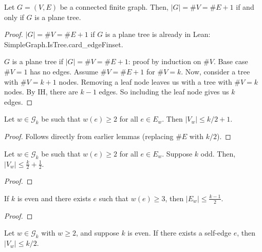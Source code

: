 \begin{proposition}
  \label{prop:vertex_edge_tree_equality}
  \notready
  Let $G=(V,E)$ be a connected finite graph. Then, $|G|=\#V=\#E+1$ if and only if $G$ is a plane tree.
\end{proposition}

\begin{proof}
  \notready
  $|G|=\#V=\#E+1$ if $G$ is a plane tree is already in Lean: SimpleGraph.IsTree.card\_edgeFinset.

  $G$ is a plane tree if $|G|=\#V=\#E+1$: proof by induction on $\#V$. Base case $\#V = 1$ has no edges. Assume $\#V = \#E + 1$ for $\#V = k$. Now, consider a tree with $\#V = k+1$ nodes. Removing a leaf node leaves us with a tree with $\#V = k$ nodes. By IH, there are $k - 1$ edges. So including the leaf node gives us $k$ edges.
\end{proof}


\begin{lemma}
  \label{lem:vertex_bound}
  Let $w \in \mathcal{G}_k$ be such that $w(e) \geq 2$ for all $e \in E_w$. Then $|V_w| \le k/2 + 1$.
\end{lemma}

\begin{proof}
  Follows directly from earlier lemmas (replacing $\#E$ with $k/2$).
\end{proof}


\begin{lemma}
  \label{lem:odd_vertex_bound}
  Let $w \in \mathcal{G}_k$ be such that $w(e) \geq 2$ for all $e \in E_w$.
  Suppose $k$ odd. Then, $|V_w| \le \frac{k}{2} + \frac{1}{2}$.
\end{lemma}

\begin{proof}
\end{proof}


\begin{lemma}
  \label{lem:edge_bound_large_w}
  If $k$ is even and there exists $e$ such that $w(e) \ge 3$, then $|E_w| \le \frac{k-1}{2}$.
\end{lemma}

\begin{proof}
\end{proof}


\begin{proposition}%
  \label{prop:g_bound_self_edge}
  Let $w\in\mathcal{G}_k$ with $w\ge 2$, and suppose $k$ is even. If there exists a self-edge $e$,
  then $|V_w|\le k/2$.
\end{proposition}

